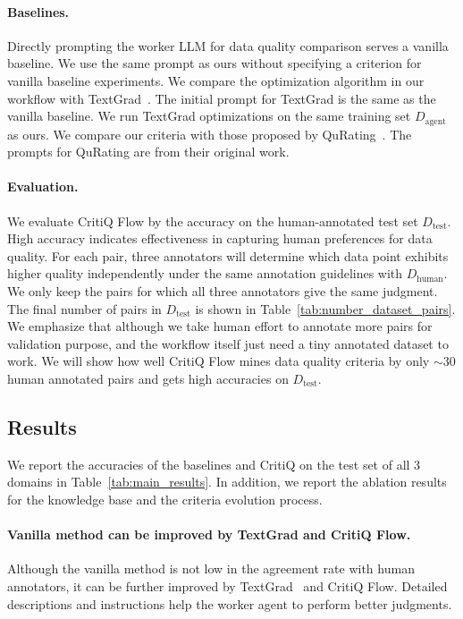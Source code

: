 \paragraph{Baselines.}
Directly prompting the worker LLM for data quality comparison serves a vanilla
baseline. We use the same prompt as ours without specifying a criterion for vanilla
baseline experiments. We compare the optimization algorithm in our workflow with
TextGrad~\citep{yuksekgonul_textgrad_2024}. The initial prompt for TextGrad is
the same as the vanilla baseline. We run TextGrad optimizations on the same training
set $D_{\text{agent}}$ as ours. We compare our criteria with those proposed by
QuRating~\citep{wettig_qurating_2024}. The prompts for QuRating are from their
original work.

\paragraph{Evaluation.}
We evaluate CritiQ Flow by the accuracy on the human-annotated test set $D_{\text{test}}$.
High accuracy indicates effectiveness in capturing human preferences for data
quality. For each pair, three annotators will determine which data point
exhibits higher quality independently under the same annotation guidelines with
$D_{\text{human}}$. We only keep the pairs for which all three annotators give the
same judgment. The final number of pairs in $D_{\text{test}}$ is shown in Table~\ref{tab:number_dataset_pairs}.
We emphasize that although we take human effort to annotate more pairs for validation
purpose, and the workflow itself just need a tiny annotated dataset to work. We will
show how well CritiQ Flow mines data quality criteria by only $\sim$30 human
annotated pairs and gets high accuracies on $D_{\text{test}}$.

\subsection{Results}

We report the accuracies of the baselines and CritiQ on the test set of all 3 domains
in Table~\ref{tab:main_results}. In addition, we report the ablation results for
the knowledge base and the criteria evolution process.

\paragraph{Vanilla method can be improved by TextGrad and CritiQ Flow.}
Although the vanilla method is not low in the agreement rate with human
annotators, it can be further improved by TextGrad~\citep{yuksekgonul_textgrad_2024}
and CritiQ Flow. Detailed descriptions and instructions help the worker agent to
perform better judgments.

